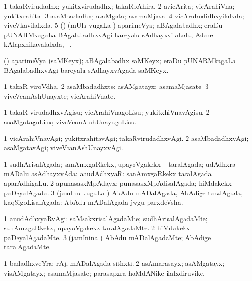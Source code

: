 \bentry
{}
\gl{\gu}
\bmng
\bnum
\num{1} takaRvirudadhx; yukitxvirudadhx; takaRbAhira. 
\num{2} avicArita; vicArahiVna; yukitxrahita. 
\num{3} asaMbadadhx; asaMgata; asamaMjasa. 
\num{4} vicArabudidhxyilalxda; viveVkavilalxda. 
\num{5} (\ga) (mUla \mo vugaLa \vi) aparimeVya; aBAgalabadhx; eraDu pUNARMkagaLa BAgalabadhxvAgi bareyalu sAdhayxvilalxda, Adare kAlapxnikavalalxda, \udA\ \eng{$\sqrt\bg 2\eg$}. 
\enum
\emng
\eentry

\bentry
{}
\gl{\nA}(\ga)
\bmng
aparimeVya (saMKeyx); aBAgalabadhx saMKeyx; eraDu pUNARMkagaLa BAgalabadhxvAgi bareyalu sAdhayxvAgada saMKeyx. 
\emng
\eentry

\bentry
{}
\gl{\nA}
\bmng
\bnum
\num{1} takaR viroVdha. 
\num{2} asaMbadadhxte; asAMgatayx; asamaMjasate. 
\num{3} viveVcanAshUnayxte; vicArahiVnate. 
\enum
\emng
\eentry

\bentry
{}
\gl{\sakirx}
\bmng
\bnum
\num{1} takaR virudadhxvAgisu; vicArahiVnagoLisu; yukitxhiVnavAgisu. 
\num{2} asaMgatagoLisu; viveVcanA shUnayxgoLisu. 
\enum
\emng
\eentry

\bentry
{}
\gl{\kirxvi}
\bmng
\bnum
\num{1} vicArahiVnavAgi; yukitxrahitavAgi; takaRvirudadhxvAgi. 
\num{2} asaMbadadhxvAgi; asaMgatavAgi; viveVcanAshUnayxvAgi. 
\enum
\emng
\eentry

\bentry
{}
\gl{\gu}
\bmng
\bnum
\num{1} sudhArisalAgada; sanAmxgaRkekx, upayoVgakekx -- taralAgada; udAdhxra mADalu asAdhayxvAda; anudAdhxyaR:  sanAmxgaRkekx taralAgada aparAdhigaLu. 
\num{2} apunasasxMpAdayx; punasasxMpAdisalAgada; hiMdakekx paDeyalAgada. 
\num{3} (jamInu \mo vugaLa \vi) AbAdu mADalAgada; AbAdige taralAgada; kaqSigoLisalAgada:  AbAdu mADalAgada jwgu parxdeVsha. 
\enum
\emng
\eentry

\bentry
{}
\gl{\kirxvi}
\bmng
\bnum
\num{1} anudAdhxyaRvAgi; saMsakxrisalAgadaMte; sudhArisalAgadaMte; sanAmxgaRkekx, upayoVgakekx taralAgadaMte. 
\num{2} hiMdakekx paDeyalAgadaMte. 
\num{3} (jamInina \vi) AbAdu mADalAgadaMte; AbAdige taralAgadaMte. 
\enum
\emng
\eentry

\bentry
{}
\gl{\nA}
\bmng
\bnum
\num{1} badadhxveYra; rAji mADalAgada sithxti. 
\num{2} asAmarasayx; asAMgatayx; visAMgatayx; asamaMjasate; parasapxra hoMdANike ilalxdiruvike. 
\enum
\emng
\eentry

